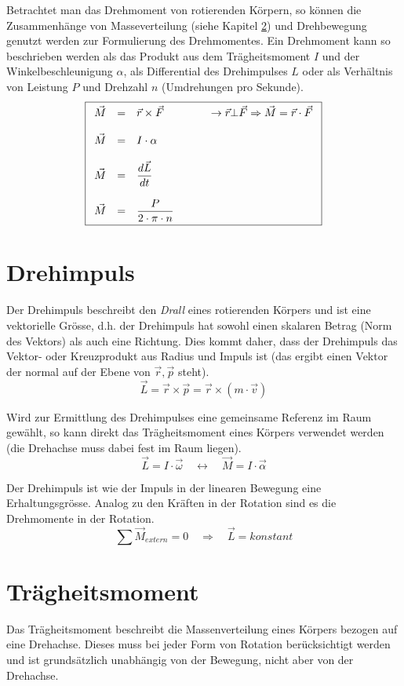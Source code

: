 Betrachtet man das Drehmoment von rotierenden Körpern, so können die
Zusammenhänge von Masseverteilung (siehe Kapitel 
\ref{sec:traegheitsmoment}) und Drehbewegung genutzt werden zur
Formulierung des Drehmomentes. Ein Drehmoment kann so beschrieben werden
als das Produkt aus dem Trägheitsmoment $I$ und der Winkelbeschleunigung
$\alpha$, als Differential des Drehimpulses $L$ oder als Verhältnis von 
Leistung $P$ und Drehzahl $n$ (Umdrehungen pro Sekunde).
\[ \boxed{\begin{array}{r c l}
	\vec{M}
		&=& \displaystyle \vec{r} \times \vec{F}
			\qquad \qquad \rightarrow \vec{r} \bot \vec{F} 
			\Rightarrow \vec{M} = \vec{r} \cdot \vec{F} \\
	& & \\
	\vec{M} 
		&=& \displaystyle I \cdot \alpha \\
	& & \\
	\vec{M} 
		&=& \displaystyle \frac{d\vec{L}}{dt} \\
	& & \\
	\vec{M} 
		&=& \displaystyle \frac{P}{2 \cdot \pi \cdot n}
\end{array} }\]

\section{Drehimpuls}
Der Drehimpuls beschreibt den \textit{Drall} eines rotierenden Körpers
und ist eine vektorielle Grösse, d.h. der Drehimpuls hat sowohl einen
skalaren Betrag (Norm des Vektors) als auch eine Richtung. Dies kommt
daher, dass der Drehimpuls das Vektor- oder Kreuzprodukt aus Radius und
Impuls ist (das ergibt einen Vektor der normal auf der Ebene von 
$\vec{r},\vec{p}$ steht).
\[ \boxed{
	\vec{L}
		= \vec{r} \times \vec{p}
		= \vec{r} \times(m \cdot \vec{v})
}\]

\noindent
Wird zur Ermittlung des Drehimpulses eine gemeinsame Referenz im Raum
gewählt, so kann direkt das Trägheitsmoment eines Körpers verwendet
werden (die Drehachse muss dabei fest im Raum liegen).
\[ \boxed{
	\vec{L} = I \cdot \vec{\omega} 
	\quad \leftrightarrow \quad
	\vec{M} = I \cdot \vec{\alpha}
} \]

\noindent
Der Drehimpuls ist wie der Impuls in der linearen Bewegung eine 
Erhaltungsgrösse. Analog zu den Kräften in der Rotation 
sind es die Drehmomente in der Rotation. 
\[ \boxed{
	\sum \vec{M}_{extern} = 0 
	\quad \Rightarrow \quad 
	\vec{L} = konstant
} \]

\section{Trägheitsmoment}\label{sec:traegheitsmoment}
Das Trägheitsmoment beschreibt die Massenverteilung eines Körpers
bezogen auf eine Drehachse. Dieses muss bei jeder Form von Rotation
berücksichtigt werden und ist grundsätzlich unabhängig von der 
Bewegung, nicht aber von der Drehachse.

